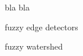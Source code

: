 \begin{thebibliography}{9}
        bla bla

        fuzzy edge detectors
        
        fuzzy watershed

\end{thebibliography} 